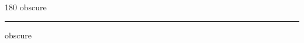 
\begin{frame}
\begin{center}
\begin{turn}{180}
{\fontsize{2.5cm}{1em}\selectfont obscure}
\end{turn}
\vspace{1em}\par  
\hrule
\vspace{1em}\par  
{\fontsize{2.5cm}{1em}\selectfont obscure}
\end{center}
\end{frame}
